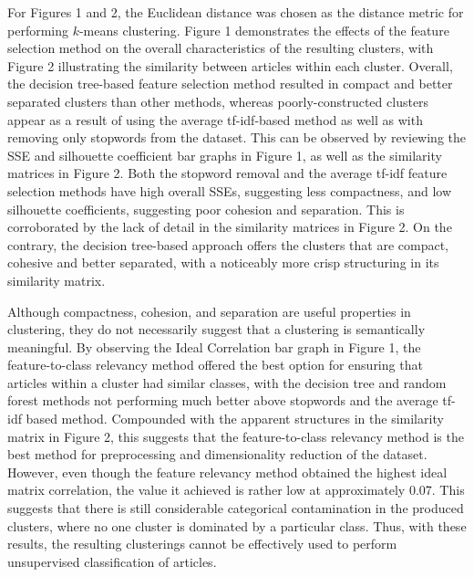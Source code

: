 \documentclass[11pt]{article}
\begin{document}
For Figures 1 and 2, the Euclidean distance was chosen as the distance metric for performing $k$-means clustering.
Figure 1 demonstrates the effects of the feature selection method on the overall characteristics of the resulting clusters, with Figure 2 illustrating the similarity between articles within each cluster.
Overall, the decision tree-based feature selection method resulted in compact and better separated clusters than other methods, whereas poorly-constructed clusters appear as a result of using the average tf-idf-based method as well as with removing only stopwords from the dataset.
This can be observed by reviewing the SSE and silhouette coefficient bar graphs in Figure 1, as well as the similarity matrices in Figure 2.
Both the stopword removal and the average tf-idf feature selection methods have high overall SSEs, suggesting less compactness, and low silhouette coefficients, suggesting poor cohesion and separation.
This is corroborated by the lack of detail in the similarity matrices in Figure 2.
On the contrary, the decision tree-based approach offers the clusters that are compact, cohesive and better separated, with a noticeably more crisp structuring in its similarity matrix.

Although compactness, cohesion, and separation are useful properties in clustering, they do not necessarily suggest that a clustering is semantically meaningful.
By observing the Ideal Correlation bar graph in Figure 1, the feature-to-class relevancy method offered the best option for ensuring that articles within a cluster had similar classes, with the decision tree and random forest methods not performing much better above stopwords and the average tf-idf based method.
Compounded with the apparent structures in the similarity matrix in Figure 2, this suggests that the feature-to-class relevancy method is the best method for preprocessing and dimensionality reduction of the dataset.
However, even though the feature relevancy method obtained the highest ideal matrix correlation, the value it achieved is rather low at approximately 0.07.
This suggests that there is still considerable categorical contamination in the produced clusters, where no one cluster is dominated by a particular class.
Thus, with these results, the resulting clusterings cannot be effectively used to perform unsupervised classification of articles.

\end{document}
